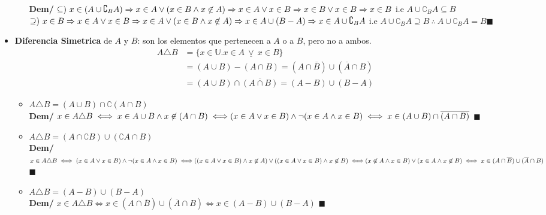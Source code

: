 \documentclass[11pt,a4paper]{article}
\newcommand*{\QEDA}{\null\nobreak\hfill\ensuremath{\blacksquare}}
\begin{document}
\begin{itemize}
\begin{itemize}
\textbf{Dem/} $\subseteq)\ x \in (A \cup \complement_B A) \Rightarrow x \in A \lor (x \in B \land x \not \in A) \Rightarrow x \in A \lor x \in B \Rightarrow \\ x \in B \lor x \in B \Rightarrow x \in B$ i.e $A \cup \complement_B A \subseteq B$\\
$\supseteq)\ x \in B \Rightarrow x \in A \lor x \in B \Rightarrow x \in A \lor (x \in B \land x \not \in A) \Rightarrow x \in A \cup (B - A) \Rightarrow \\ x \in A \cup \complement_B A$ i.e $A \cup \complement_B A \supseteq B\ \therefore\ A \cup \complement_B A = B$\QEDA
\end{itemize}

\item \textbf{Diferencia Simetrica} de $A$ y $B$: son los elementos que pertenecen a $A$ o a $B$, pero no a ambos.
\begin{align*}
A \triangle B 
&= \{x\in \mathbb{U} . x\in A\ \underline{\lor}\ x\in B\}\\
&= (A \cup B) - (A \cap B) = (A \cap \overline{B}) \cup (\overline{A} \cap B)\\
&= (A \cup B) \cap \overline{(A \cap B)} = (A-B) \cup (B-A)
\end{align*}

\begin{itemize}
\item $A \triangle B = (A \cup B) \cap \complement (A \cap B)$\\
\textbf{Dem/} $x \in A \triangle B \iff x \in A \cup B \land x \not \in (A \cap B) \iff \\
(x \in A \lor x \in B) \land \lnot (x \in A \land x \in B) \iff
x \in (A \cup B) \cap \overline{(A \cap B)}$ \QEDA
\item $A \triangle B = (A \cap \complement B) \cup (\complement A \cap B)$\\
\textbf{Dem/} $x \in A \triangle B \iff (x \in A \lor x \in B) \land \lnot (x \in A \land x \in B) \iff \\
((x \in A \lor x \in B) \land x \not \in A) \lor ((x \in A \lor x \in B) \land x \not \in B) \iff \\
(x \not \in A \land x \in B) \lor (x \in A \land x \not \in B) \iff x \in (A \cap \overline{B}) \cup (\overline{A} \cap B)$ \QEDA
\item $A \triangle B = (A-B) \cup (B-A)$\\
\textbf{Dem/} $x \in A \triangle B \iff x \in (A \cap \overline{B}) \cup (\overline{A} \cap B) \iff x \in (A - B) \cup (B - A)
$ \QEDA
\end{itemize}


\end{itemize}
\end{document}
